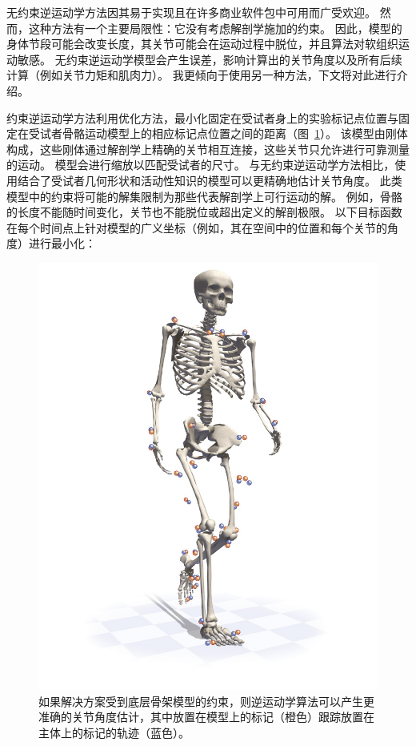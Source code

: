 无约束逆运动学方法因其易于实现且在许多商业软件包中可用而广受欢迎。
然而，这种方法有一个主要局限性：它没有考虑解剖学施加的约束。
因此，模型的身体节段可能会改变长度，其关节可能会在运动过程中脱位，并且算法对软组织运动敏感。
无约束逆运动学模型会产生误差，影响计算出的关节角度以及所有后续计算（例如关节力矩和肌肉力）。
我更倾向于使用另一种方法，下文将对此进行介绍。




约束逆运动学方法利用优化方法，最小化固定在受试者身上的实验标记点位置与固定在受试者骨骼运动模型上的相应标记点位置之间的距离（图~\ref{fig:7_14}）。
该模型由刚体构成，这些刚体通过解剖学上精确的关节相互连接，这些关节只允许进行可靠测量的运动。
模型会进行缩放以匹配受试者的尺寸。
与无约束逆运动学方法相比，使用结合了受试者几何形状和活动性知识的模型可以更精确地估计关节角度。
此类模型中的约束将可能的解集限制为那些代表解剖学上可行运动的解。
例如，骨骼的长度不能随时间变化，关节也不能脱位或超出定义的解剖极限。
以下目标函数在每个时间点上针对模型的广义坐标（例如，其在空间中的位置和每个关节的角度）进行最小化：


\begin{figure}[!htb]
	\centering
	\includegraphics[width=0.9\linewidth]{chap7/7_14}
	\caption{如果解决方案受到底层骨架模型的约束，则逆运动学算法可以产生更准确的关节角度估计，其中放置在模型上的标记（橙色）跟踪放置在主体上的标记的轨迹（蓝色）。 \label{fig:7_14}}
\end{figure}


